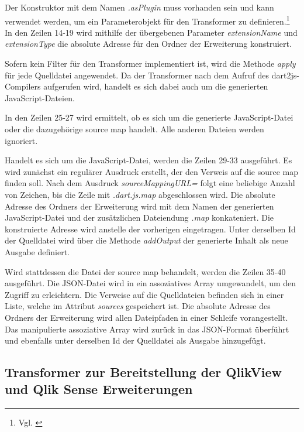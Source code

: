 Der Konstruktor mit dem Namen \textit{.asPlugin} muss vorhanden sein und kann verwendet werden, um ein Parameterobjekt für den Transformer zu definieren.\footnote{Vgl. \cite{WritingAPubTransformer}} In den Zeilen 14-19 wird mithilfe der übergebenen Parameter \textit{extensionName} und \textit{extensionType} die absolute Adresse für den Ordner der Erweiterung konstruiert. 



Sofern kein Filter für den Transformer implementiert ist, wird die Methode \textit{apply} für jede Quelldatei angewendet. Da der Transformer nach dem Aufruf des dart2js-Compilers aufgerufen wird, handelt es sich dabei auch um die generierten JavaScript-Dateien.

In den Zeilen 25-27 wird ermittelt, ob es sich um die generierte JavaScript-Datei oder die dazugehörige source map handelt. Alle anderen Dateien werden ignoriert.

Handelt es sich um die JavaScript-Datei, werden die Zeilen 29-33 ausgeführt. Es wird zunächst ein regulärer Ausdruck erstellt, der den Verweis auf die source map finden soll. Nach dem Ausdruck \textit{sourceMappingURL=} folgt eine beliebige Anzahl von Zeichen, bis die Zeile mit \textit{.dart.js.map} abgeschlossen wird. Die absolute Adresse des Ordners der Erweiterung wird mit dem Namen der generierten JavaScript-Datei und der zusätzlichen Dateiendung \textit{.map} konkateniert. Die konstruierte Adresse wird anstelle der vorherigen eingetragen. Unter derselben Id der Quelldatei wird über die Methode \textit{addOutput} der generierte Inhalt als neue Ausgabe definiert.

Wird stattdessen die Datei der source map behandelt, werden die Zeilen 35-40 ausgeführt. Die JSON-Datei wird in ein assoziatives Array umgewandelt, um den Zugriff zu erleichtern. Die Verweise auf die Quelldateien befinden sich in einer Liste, welche im Attribut \textit{sources} gespeichert ist. Die absolute Adresse des Ordners der Erweiterung wird allen Dateipfaden in einer Schleife vorangestellt. Das manipulierte assoziative Array wird zurück in das JSON-Format überführt und ebenfalls unter derselben Id der Quelldatei als Ausgabe hinzugefügt.

\subsection{Transformer zur Bereitstellung der QlikView und Qlik Sense Erweiterungen}
\label{lab:TransformerZurBereitstellungDerQlikViewUndQlikSenseErweiterungen} 

